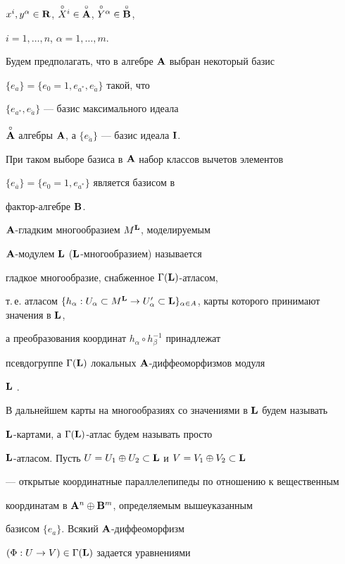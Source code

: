 $x^i,y^\alpha\in{{\bold R}}$, $\overset{\circ}{X}{}^i\in{\overset{\circ}{\bold A}{}}$, $\overset{\circ}{Y}{}^\alpha\in{\overset{\circ}{\bold B}{}}$,


$i=1,\dotsc,n$, $\alpha=1,\dotsc,m$.


Будем предполагать, что в алгебре ${\bold A}$ выбран некоторый базис


$\{e_a\}=\{e_0=1, e_{a^*}, e_{\check a}\}$ такой, что


$\{e_{a^*}, e_{\check a}\}$ --- базис максимального идеала


$\overset{\circ}{\bold A}{}$ алгебры ${{\bold A}}$, а $\{e_{\check a}\}$ --- базис идеала ${{\bold I}}$.


При таком выборе базиса в ${\bold A}$ набор классов вычетов элементов


$\{e_{\overline a}\}=\{e_0=1, e_{a^*}\}$ является базисом в


фактор-алгебре ${\bold B}$.





${\bold A}$-гладким многообразием $M^{{\bold L}}$, моделируемым


${\bold A}$-модулем ${\bold L}$ (${\bold L}$-многообразием) называется


гладкое многообразие, снабженное $\Gamma({\bold L})$-атласом,


т.\,е. атласом $\{h_\alpha:U_\alpha\subset M^{\L} \to U_\alpha'\subset\L


\}_{\alpha\in A}$, карты которого принимают значения в $\L$,


а преобразования координат $h_\alpha\circ h^{-1}_\beta$ принадлежат


псевдогруппе $\Gamma({\bold L})$ локальных ${\bold A}$-диффеоморфизмов модуля


${\bold L}$ \cite{ShS}.


В дальнейшем карты на многообразиях со значениями в ${\bold L}$ будем называть


${\bold L}$-картами, а $\Gamma({\bold L})$-атлас будем называть просто


${\bold L}$-атласом. Пусть $U=U_1\oplus U_2\subset{\bold L}$ и $V=V_1\oplus V_2\subset{\bold L}$


--- открытые координатные параллелепипеды по отношению к вещественным 


координатам в ${\bold A}^n\oplus{\bold B}^m$, определяемым вышеуказанным


базисом $\{e_a\}$. Всякий ${\bold A}$-диффеоморфизм


$(\Phi:U\to V)\in\Gamma({\bold L})$ задается уравнениями \cite{ShS}


